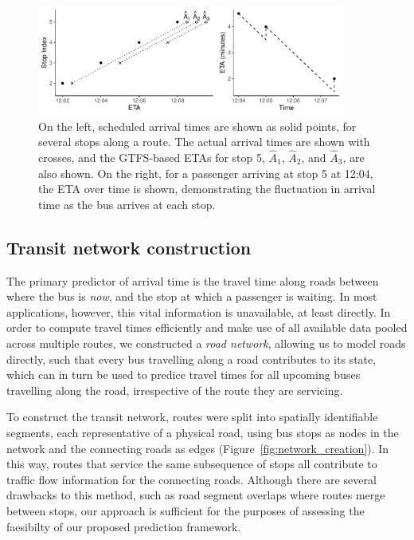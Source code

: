 \begin{figure}[tb]
    \centering
    \includegraphics[width=0.9\textwidth]{figures/02_gtfs_delays.pdf}
    \caption{
        On the left, scheduled arrival times are shown as solid points,
        for several stops along a route. The actual arrival times
        are shown with crosses,
        and the GTFS-based ETAs for stop 5, $\hat A_1$, $\hat A_2$, and $\hat A_3$, are also shown.
        On the right,
        for a passenger arriving at stop 5 at 12:04,
        the ETA over time is shown, demonstrating the fluctuation in
        arrival time as the bus arrives at each stop.
    }
    \label{fig:gtfs-delays}
\end{figure}



\subsection{Transit network construction}
\label{sec:network_build}

The primary predictor of arrival time is 
the travel time along roads between where the bus is \emph{now},
and the stop at which a passenger is waiting.
In most applications, however, this vital information is unavailable, at least directly.
In order to compute travel times efficiently
and make use of all available data pooled across multiple routes,
we constructed a \emph{road network},
allowing us to model roads directly,
such that every bus travelling along a road contributes to its state,
which can in turn be used to predice travel times for all upcoming buses 
travelling along the road,
irrespective of the route they are servicing.


To construct the transit network,
routes were split into spatially identifiable segments,
each representative of a physical road,
using bus stops as nodes in the network
and the connecting roads as edges
(Figure~\ref{fig:network_creation}).
In this way, routes that service the same subsequence of stops
all contribute to traffic flow information for the connecting roads.
Although there are several drawbacks to this method,
such as road segment overlaps where routes merge between stops,
our approach is sufficient for the purposes of assessing the \rt 
faesibilty of our proposed prediction framework.



